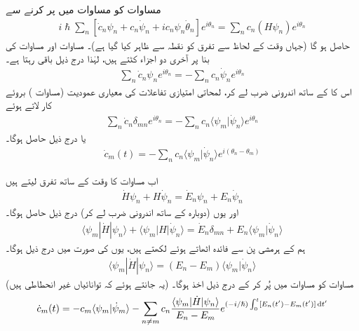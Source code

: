  مساوات    کو مساوات    میں پر کرنے سے
\begin{align}
i \hslash \sum_n [\dot{c}_n \psi_n + c_n \dot{\psi}_n + i c_n \psi_n \dot{\theta}_n] e^{i \theta_n} = \sum_n c_n (H \psi_n) e^{i \theta_n} 
\end{align}
حاصل ہو گا  (جہاں وقت کے لحاظ سے تفرق کو نقطہ  سے ظاہر کیا گیا ہے)۔  مساوات    اور  مساوات   کی بنا پر آخری دو اجزاء کٹتے ہیں،  لہٰذا درج ذیل باقی رہتا ہے۔ 
\begin{align}
\sum_n \dot{c}_n \psi_n e^{i \theta_n} = - \sum_n c_n \dot{\psi}_n e^{i \theta_n}
\end{align}
اس کا  کے ساتھ اندرونی ضرب لے کر،  لمحاتی امتیازی تفاعلات کی معیاری  عمودیت (مساوات ) بروئے کار لاتے ہوئے 
\begin{align*}
\sum_n \dot{c}_n \delta_{mn} e^{i \theta_n} = - \sum_n c_n \langle \psi_m | \dot{\psi}_n \rangle e^{i \theta_n}
\end{align*}
یا درج ذیل  حاصل ہوگا۔ 
\begin{align}\label{مساوات_حر_تفرق_عددی_سر}
\dot{c}_m (t) = - \sum_n c_n \langle \psi_m | \dot{\psi}_n \rangle e^{i(\theta_n - \theta_m)}
\end{align}

اب مساوات   کا وقت کے ساتھ تفرق لیتے ہیں 
\begin{align*}
\dot{H} \psi_n + H \dot{\psi}_n = \dot{E}_n \psi_n + E_n \dot{\psi}_n
\end{align*}
اور  یوں (دوبارہ   کے ساتھ اندرونی ضرب لے کر)  درج ذیل حاصل  ہوگا۔ 
\begin{align}
\langle \psi_m | \dot{H} | \psi_n \rangle + \langle \psi_m | H | \dot{\psi}_n \rangle = \dot{E}_n \delta_{mn} + E_n \langle \psi_m | \dot{\psi}_n \rangle
\end{align} 
ہم  کے ہرمشی  پن  سے فائدہ اٹھاتے ہوئے  لکھتے ہیں،  یوں   کی صورت  میں درج ذیل ہوگا۔
\begin{align}\label{مساوات_حر_نابرابر_صورت}
\langle \psi_m | \dot{H} | \psi_n \rangle = (E_n - E_m) \langle \psi_m | \dot{\psi}_n \rangle
\end{align}
(یہ جانتے ہوئے کہ  توانائیاں غیر انحطاطی ہیں)  مساوات      کو مساوات    میں پُر کر کے درج ذیل اخذ ہوگا۔
\begin{align}
\dot{c}_m (t) = - c_m \langle \psi_m | \dot{\psi}_m \rangle - \sum_{n \ne m} c_n \frac{\langle \psi_m | \dot{H} | \psi_n \rangle}{E_n - E_m} e ^{(- i / \hslash) \int_0^t [E_n(t') - E_m(t')] \dif t' }
\end{align}

